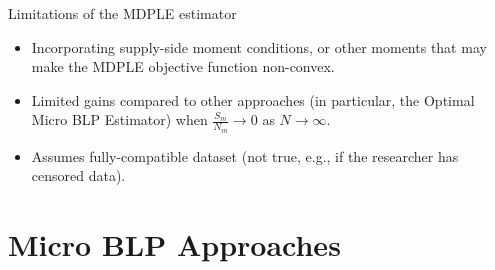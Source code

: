 \documentclass[aspectratio=169,10pt]{beamer}
\begin{document}


\begin{frame}{Limitations of the MDPLE estimator}
    
    \begin{itemize}

        \item Incorporating supply-side moment conditions, or other moments that may make the MDPLE objective function non-convex.
        \item Limited gains compared to other approaches (in particular, the Optimal Micro BLP Estimator) when $\frac{S_m}{N_m}\to 0$ as $N\to\infty$.
        \item Assumes fully-compatible dataset (not true, e.g., if the researcher has censored data).
    \end{itemize}
\end{frame}



\section*{Micro BLP Approaches}
\end{document}
